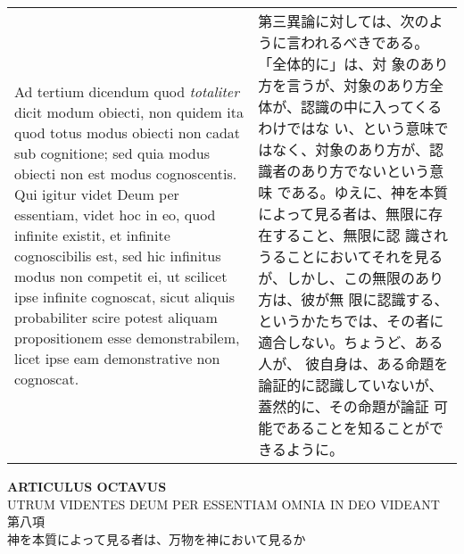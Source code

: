 \documentclass[10pt]{jsarticle} %
\begin{document}
\begin{longtable}{p{21em}p{21em}}
\\


{\sc Ad tertium dicendum} quod {\it totaliter} dicit modum obiecti,
non quidem ita quod totus modus obiecti non cadat sub cognitione; sed
quia modus obiecti non est modus cognoscentis. Qui igitur videt Deum
per essentiam, videt hoc in eo, quod infinite existit, et infinite
cognoscibilis est, sed hic infinitus modus non competit ei, ut
scilicet ipse infinite cognoscat, sicut aliquis probabiliter scire
potest aliquam propositionem esse demonstrabilem, licet ipse eam
demonstrative non cognoscat.


&


第三異論に対しては、次のように言われるべきである。「全体的に」は、対
象のあり方を言うが、対象のあり方全体が、認識の中に入ってくるわけではな
い、という意味ではなく、対象のあり方が、認識者のあり方でないという意味
である。ゆえに、神を本質によって見る者は、無限に存在すること、無限に認
識されうることにおいてそれを見るが、しかし、この無限のあり方は、彼が無
限に認識する、というかたちでは、その者に適合しない。ちょうど、ある人が、
彼自身は、ある命題を論証的に認識していないが、蓋然的に、その命題が論証
可能であることを知ることができるように。


\end{longtable}

\newpage
{}

\begin{center}
 {\Large {\bf ARTICULUS OCTAVUS}}\\
{\large UTRUM VIDENTES DEUM PER ESSENTIAM OMNIA IN DEO VIDEANT\\
第八項\\
神を本質によって見る者は、万物を神において見るか}
\end{center}
\end{document}

